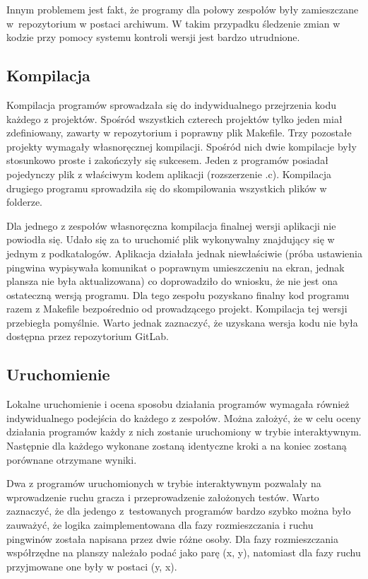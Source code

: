 Innym problemem jest fakt, że programy dla połowy zespołów były zamieszczane w~repozytorium w postaci archiwum.
W takim przypadku śledzenie zmian w kodzie przy pomocy systemu kontroli wersji jest bardzo utrudnione.

\subsection{Kompilacja}

Kompilacja programów sprowadzała się do indywidualnego przejrzenia kodu każdego z projektów.
Spośród wszystkich czterech projektów tylko jeden miał zdefiniowany, zawarty w repozytorium i poprawny plik Makefile.
Trzy pozostałe projekty wymagały własnoręcznej kompilacji.
Spośród nich dwie kompilacje były stosunkowo proste i zakończyły się sukcesem.
Jeden z programów posiadał pojedynczy plik z właściwym kodem aplikacji (rozszerzenie .c).
Kompilacja drugiego programu sprowadziła się do skompilowania wszystkich plików w folderze.

Dla jednego z zespołów własnoręczna kompilacja finalnej wersji aplikacji nie powiodła się.
Udało się za to uruchomić plik wykonywalny znajdujący się w jednym z podkatalogów.
Aplikacja działała jednak niewłaściwie (próba ustawienia pingwina wypisywała komunikat o poprawnym umieszczeniu na ekran, jednak plansza nie była aktualizowana) co doprowadziło do wniosku, że nie jest ona ostateczną wersją programu.
Dla tego zespołu pozyskano finalny kod programu razem z Makefile bezpośrednio od prowadzącego projekt.
Kompilacja tej wersji przebiegła pomyślnie.
Warto jednak zaznaczyć, że uzyskana wersja kodu nie była dostępna przez repozytorium GitLab.

\subsection{Uruchomienie}

Lokalne uruchomienie i ocena sposobu działania programów wymagała również indywidualnego podejścia do każdego z zespołów.
Można założyć, że w celu oceny działania programów każdy z nich zostanie uruchomiony w trybie interaktywnym.
Następnie dla każdego wykonane zostaną identyczne kroki a na koniec zostaną porównane otrzymane wyniki.

Dwa z programów uruchomionych w trybie interaktywnym pozwalały na wprowadzenie ruchu gracza i przeprowadzenie założonych testów.
Warto zaznaczyć, że dla jedengo z~testowanych programów bardzo szybko można było zauważyć, że logika zaimplementowana dla fazy rozmieszczania i ruchu pingwinów została napisana przez dwie różne osoby.
Dla fazy rozmieszczania współrzędne na planszy należało podać jako parę (x, y), natomiast dla fazy ruchu przyjmowane one były w postaci (y, x).


